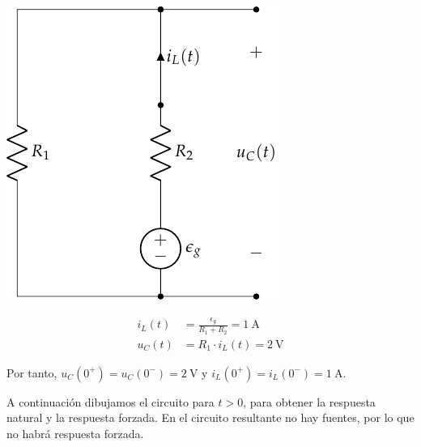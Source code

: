 \vspace{3mm}
\begin{minipage}{0.3\textwidth}
  \includegraphics[scale=0.9]{figuras/FM_4_9_t0-}
\end{minipage}
\begin{minipage}{0.7\textwidth}
  \begin{align*}
    i_L(t) &= \frac{\epsilon_g}{R_1 + R_2} = \SI{1}{\ampere}\\[10pt]
    u_C(t) &= R_1 \cdot i_L(t) = \SI{2}{\volt}    
  \end{align*}
\end{minipage}

\vspace{3mm}
Por tanto, $u_C(0^+) = u_C(0^-) = \SI{2}{\volt}$ \; y
\;
$i_L(0^+) = i_L(0^-) = \SI{1}{\ampere}$.

\vspace{3mm}
A continuación dibujamos el circuito para $t > 0$, para obtener la
respuesta natural y la respuesta forzada. En el circuito resultante no
hay fuentes, por lo que no habrá respuesta forzada.


